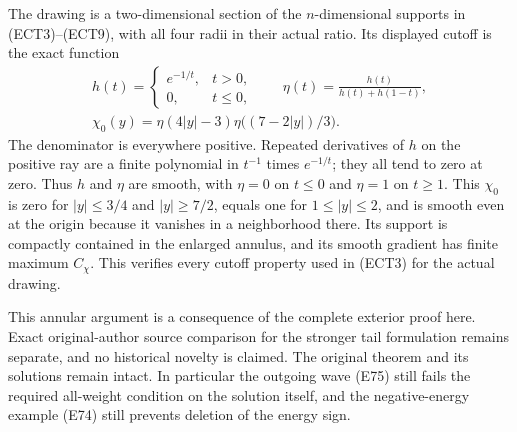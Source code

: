 \documentclass[
  11pt,
]{article}
\makeatletter
\let\ReaderOriginalAnchorStart\hyper@anchorstart
\let\ReaderOriginalAnchorEnd\hyper@anchorend
\let\ReaderPendingAliases\@empty
\def\ReaderArmAliases#1{\gdef\ReaderPendingAliases{#1}}
\def\hyper@anchorstart#1{\ReaderIfNativeAnchorTF{#1}{\ReaderPendingAliases\global\let\ReaderPendingAliases\@empty}{}\ReaderOriginalAnchorStart{#1}}
\makeatother
\begin{document}
The drawing is a two-dimensional section of the \(n\)-dimensional
supports in (ECT3)--(ECT9), with all four radii in their actual ratio.
Its displayed cutoff is the exact function \[
 \begin{gathered}
 h(t)=\begin{cases}e^{-1/t},&t>0,\\0,&t\leq0,\end{cases}
 \qquad \eta(t)=\frac{h(t)}{h(t)+h(1-t)},\\
 \chi_0(y)=\eta(4|y|-3)\eta\bigl((7-2|y|)/3\bigr).
 \end{gathered}                                                   \tag{ECT11}
\] The denominator is everywhere positive. Repeated derivatives of \(h\)
on the positive ray are a finite polynomial in \(t^{-1}\) times
\(e^{-1/t}\); they all tend to zero at zero. Thus \(h\) and \(\eta\) are
smooth, with \(\eta=0\) on \(t\leq0\) and \(\eta=1\) on \(t\geq1\). This
\(\chi_0\) is zero for \(|y|\leq3/4\) and \(|y|\geq7/2\), equals one for
\(1\leq|y|\leq2\), and is smooth even at the origin because it vanishes
in a neighborhood there. Its support is compactly contained in the
enlarged annulus, and its smooth gradient has finite maximum \(C_\chi\).
This verifies every cutoff property used in (ECT3) for the actual
drawing.

This annular argument is a consequence of the complete exterior proof
here. Exact original-author source comparison for the stronger tail
formulation remains separate, and no historical novelty is claimed. The
original theorem and its solutions remain intact. In particular the
outgoing wave (E75) still fails the required all-weight condition on the
solution itself, and the negative-energy example (E74) still prevents
deletion of the energy sign.

\ReaderArmAliases{\ReaderOriginalAnchorStart{AN03-EXU-013}\ReaderOriginalAnchorEnd\begingroup\expandafter\def\csname @currentHref\endcsname{AN03-EXU-013}\label{AN03-EXU-013}\endgroup\ReaderOriginalAnchorStart{an03-exu-013-worked-models-and-precise-nonconclusions}\ReaderOriginalAnchorEnd\begingroup\expandafter\def\csname @currentHref\endcsname{an03-exu-013-worked-models-and-precise-nonconclusions}\label{an03-exu-013-worked-models-and-precise-nonconclusions}\endgroup\ReaderOriginalAnchorStart{13-worked-models-and-precise-nonconclusions}\ReaderOriginalAnchorEnd\begingroup\expandafter\def\csname @currentHref\endcsname{13-worked-models-and-precise-nonconclusions}\label{13-worked-models-and-precise-nonconclusions}\endgroup\ReaderOriginalAnchorStart{worked-models-and-precise-nonconclusions}\ReaderOriginalAnchorEnd}
\end{document}
